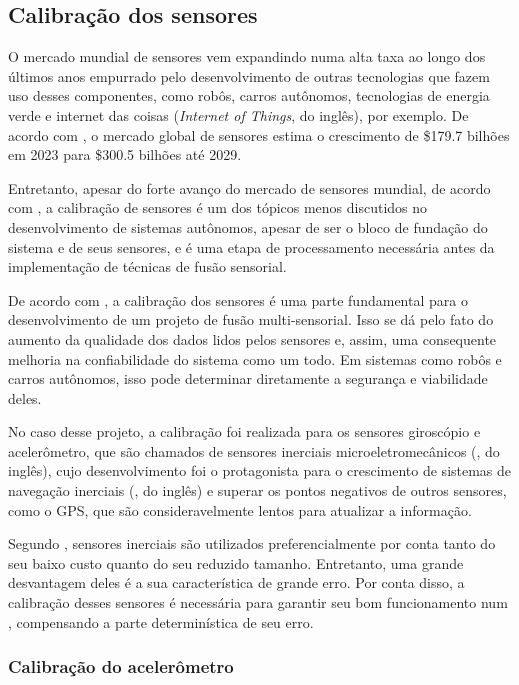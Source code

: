 \documentclass[acronym, symbols, table]{fei}
\begin{document}
		\subsection{Calibração dos sensores}\label{sec:calibracao_sensores}
		
		O mercado mundial de sensores vem expandindo numa alta taxa ao longo dos últimos anos empurrado pelo desenvolvimento de outras tecnologias que fazem uso desses componentes, como robôs, carros autônomos, tecnologias de energia verde e internet das coisas (\textit{Internet of Things}, do inglês), por exemplo. De acordo com \textcite{sensor_market}, o mercado global de sensores estima o crescimento de \$179.7 bilhões em 2023 para \$300.5 bilhões até 2029.
		
		Entretanto, apesar do forte avanço do mercado de sensores mundial, de acordo com \textcite{calibration_av}, a calibração de sensores é um dos tópicos menos discutidos no desenvolvimento de sistemas autônomos, apesar de ser o bloco de fundação do sistema e de seus sensores, e é uma etapa de processamento necessária antes da implementação de técnicas de fusão sensorial.
		
		De acordo com \textcite{lv2020targetless}, a calibração dos sensores é uma parte fundamental para o desenvolvimento de um projeto de fusão multi-sensorial. Isso se dá pelo fato do aumento da qualidade dos dados lidos pelos sensores e, assim, uma consequente melhoria na confiabilidade do sistema como um todo. Em sistemas como robôs e carros autônomos, isso pode determinar diretamente a segurança e viabilidade deles.
		
		No caso desse projeto, a calibração foi realizada para os sensores giroscópio e acelerômetro, que são chamados de sensores inerciais microeletromecânicos (, do inglês), cujo desenvolvimento foi o protagonista para o crescimento de sistemas de navegação inerciais (, do inglês) e superar os pontos negativos de outros sensores, como o GPS, que são consideravelmente lentos para atualizar a informação.
		
		Segundo \textcite{9181212}, sensores inerciais  são utilizados preferencialmente por conta tanto do seu baixo custo quanto do seu reduzido tamanho. Entretanto, uma grande desvantagem deles é a sua característica de grande erro. Por conta disso, a calibração desses sensores é necessária para garantir seu bom funcionamento num , compensando a parte determinística de seu erro.
		
			\subsubsection{Calibração do acelerômetro} \label{sec:calibracao_acelerometro}
			
\end{document}
